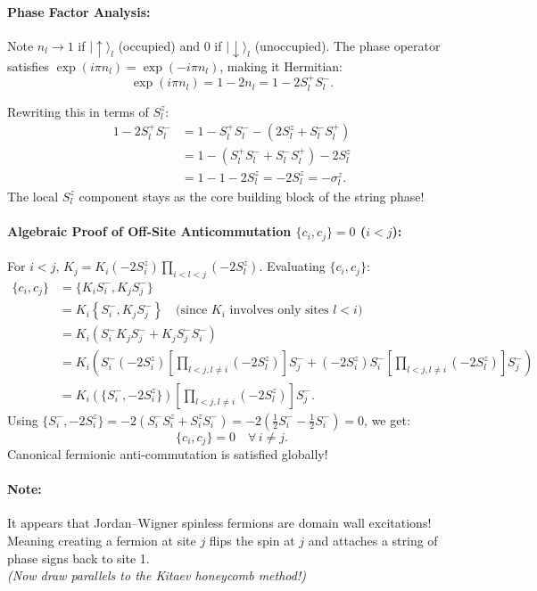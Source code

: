 \documentclass[11pt,a4paper]{article}
\begin{document}
\paragraph{Phase Factor Analysis:}
Note $n_l \to 1$ if $|\uparrow\rangle_l$ (occupied) and $0$ if $|\downarrow\rangle_l$ (unoccupied).
The phase operator satisfies $\exp(i \pi n_l) = \exp(-i \pi n_l)$, making it Hermitian:
\begin{equation}
    \exp(i \pi n_l) = 1 - 2 n_l = 1 - 2 S_l^+ S_l^-.
\end{equation}

Rewriting this in terms of $S_l^z$:
\begin{align}
    1 - 2 S_l^+ S_l^- &= 1 - S_l^+ S_l^- - (2 S_l^z + S_l^- S_l^+) \nonumber \\
    &= 1 - (S_l^+ S_l^- + S_l^- S_l^+) - 2 S_l^z \nonumber \\
    &= 1 - 1 - 2 S_l^z = -2 S_l^z = -\sigma_l^z.
\end{align}
The local $S_l^z$ component stays as the core building block of the string phase!

\paragraph{Algebraic Proof of Off-Site Anticommutation $\{c_i, c_j\} = 0$ ($i < j$):}
For $i < j$, $K_j = K_i (-2 S_i^z) \prod_{i < l < j} (-2 S_l^z)$.
Evaluating $\{c_i, c_j\}$:
\begin{align}
    \{c_i, c_j\} &= \{ K_i S_i^-, K_j S_j^- \} \nonumber \\
    &= K_i \left\{ S_i^-, K_j S_j^- \right\} \quad \text{(since } K_i \text{ involves only sites } l < i\text{)} \nonumber \\
    &= K_i \left( S_i^- K_j S_j^- + K_j S_j^- S_i^- \right) \nonumber \\
    &= K_i \left( S_i^- (-2 S_i^z) \left[ \prod_{l < j, l \neq i} (-2 S_l^z) \right] S_j^- + (-2 S_i^z) S_i^- \left[ \prod_{l < j, l \neq i} (-2 S_l^z) \right] S_j^- \right) \nonumber \\
    &= K_i \left( \{S_i^-, -2 S_i^z\} \right) \left[ \prod_{l < j, l \neq i} (-2 S_l^z) \right] S_j^-.
\end{align}
Using $\{S_i^-, -2 S_i^z\} = -2 (S_i^- S_i^z + S_i^z S_i^-) = -2 (\frac{1}{2} S_i^- - \frac{1}{2} S_i^-) = 0$, we get:
\begin{equation}
    \{c_i, c_j\} = 0 \quad \forall\, i \neq j.
\end{equation}
Canonical fermionic anti-commutation is satisfied globally!

\paragraph{Note:}
It appears that Jordan--Wigner spinless fermions are domain wall excitations! Meaning creating a fermion at site $j$ flips the spin at $j$ and attaches a string of phase signs back to site 1. \\
\textit{(Now draw parallels to the Kitaev honeycomb method!)}
\end{document}
